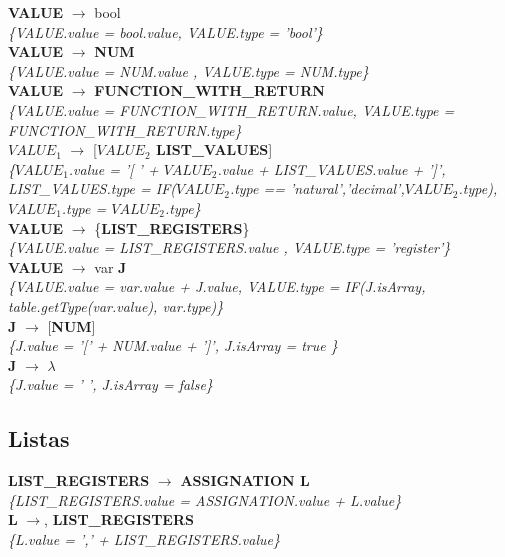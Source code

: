 \documentclass[10pt,a4paper]{article}
\begin{document}
\textbf{VALUE} $\rightarrow$ bool   \\
\textit{\{VALUE.value = bool.value, VALUE.type = 'bool'\}} \\

\textbf{VALUE} $\rightarrow$ \textbf{NUM}   \\
\textit{\{VALUE.value =  NUM.value , VALUE.type =  NUM.type\}} \\

\textbf{VALUE} $\rightarrow$ \textbf{FUNCTION\_WITH\_RETURN} \\
\textit{\{VALUE.value =  FUNCTION\_WITH\_RETURN.value, VALUE.type = FUNCTION\_WITH\_RETURN.type\}} \\

\textbf{$VALUE_1$} $\rightarrow$ [\textbf{$VALUE_2$ LIST\_VALUES}]   \\
\textit{\{$VALUE_1$.value =  '[ ' + $VALUE_2$.value + LIST\_VALUES.value + ']', LIST\_VALUES.type = IF($VALUE_2$.type == 'natural','decimal',$VALUE_2$.type), $VALUE_1$.type = $VALUE_2$.type\}} \\

\textbf{VALUE} $\rightarrow$ \{\textbf{LIST\_REGISTERS}\} \\
\textit{\{VALUE.value =  LIST\_REGISTERS.value , VALUE.type = 'register'\}} \\

\textbf{VALUE} $\rightarrow$ var \textbf{J} \\
\textit{\{VALUE.value =  var.value + J.value, VALUE.type = IF(J.isArray, table.getType(var.value), var.type)\}} \\

\textbf{J} $\rightarrow$ [\textbf{NUM}] \\
\textit{\{J.value = '[' + NUM.value + ']', J.isArray = true   \}} \\

\textbf{J} $\rightarrow$ $\lambda$   \\
\textit{\{J.value = ' ', J.isArray = false\}} \\

\subsection{Listas}
\textbf{LIST\_REGISTERS} $\rightarrow$ \textbf{ASSIGNATION L} \\
\textit{\{LIST\_REGISTERS.value = ASSIGNATION.value + L.value\}} \\

\textbf{L} $\rightarrow$, \textbf{LIST\_REGISTERS} \\
\textit{\{L.value = ',' + LIST\_REGISTERS.value\}} \\
\end{document}
